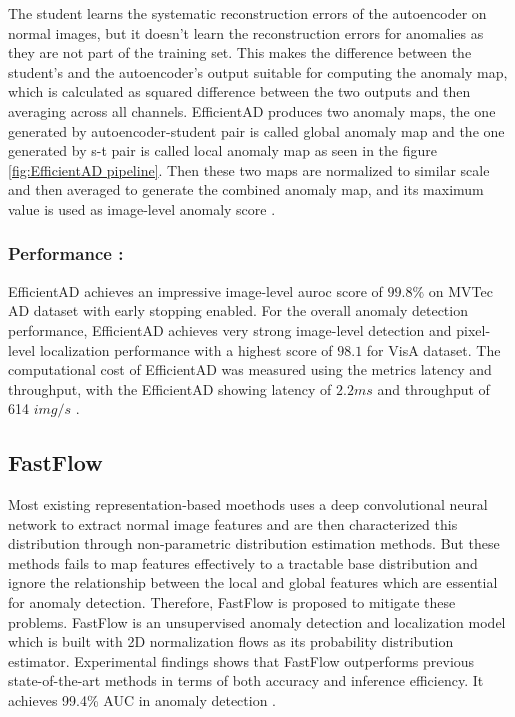 The student learns the systematic reconstruction errors of the autoencoder on normal images, but it doesn't learn the reconstruction errors for anomalies as they are not part of the training set. This makes the difference between the student's and the autoencoder's output suitable for computing the anomaly map, which is calculated as squared difference between the two outputs and then averaging across all channels. EfficientAD produces two anomaly maps, the one generated by autoencoder-student pair is called global anomaly map and the one generated by \gls{s-t} pair is called local anomaly map as seen in the figure \ref{fig:EfficientAD pipeline}. Then these two maps are normalized to similar scale and then averaged to generate the combined anomaly map, and its maximum value is used as image-level anomaly score \cite{batzner2024efficientadaccuratevisualanomaly}.

\subsubsection*{Performance :}

EfficientAD achieves an impressive image-level \gls{auroc} score of $99.8\%$ on MVTec AD dataset\cite{8954181} with early stopping enabled. For the overall anomaly detection performance, EfficientAD achieves very strong image-level detection and pixel-level localization performance with a highest score of $98.1$ for VisA\cite{zou2022spotthedifferenceselfsupervisedpretraininganomaly} dataset. The computational cost of EfficientAD was measured using the metrics latency and throughput, with the EfficientAD showing latency of $2.2ms$ and throughput of 614 $img/s$ \cite{batzner2024efficientadaccuratevisualanomaly}.

\subsection{FastFlow}
\label{subsec:fastflow}

Most existing representation-based moethods uses a deep convolutional neural network to extract normal image features and are then characterized this distribution through non-parametric distribution estimation methods. But these methods fails to map features effectively to a tractable base distribution and ignore the relationship between the local and global features which are essential for anomaly detection. Therefore, FastFlow is proposed to mitigate these problems. FastFlow is an unsupervised anomaly detection and localization model which is built with 2D normalization flows as its probability distribution estimator. Experimental findings shows that FastFlow outperforms previous state-of-the-art methods in terms of both accuracy and inference efficiency. It achieves 99.4\% AUC in anomaly detection \cite{yu2021fastflowunsupervisedanomalydetection}.


